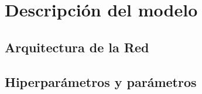\chapter{Descripción del modelo}\label{ch:DescripModelo}


\section{Arquitectura de la Red}


\section{Hiperparámetros y parámetros}

